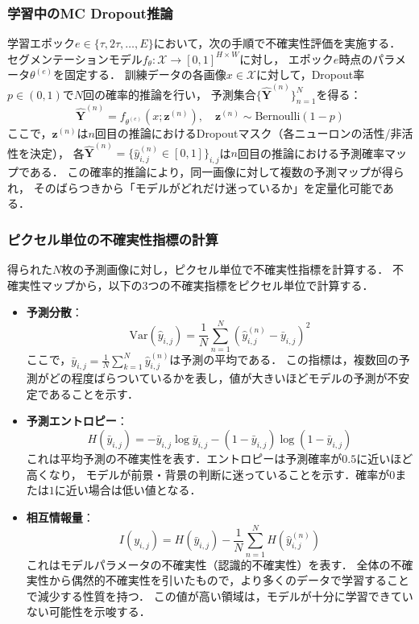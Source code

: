 \documentclass[10pt, a4paper, twocolumn]{jarticle}
\begin{document}
\subsubsection{学習中のMC Dropout推論}
学習エポック$e \in \{\tau, 2\tau, \ldots, E\}$において，次の手順で不確実性評価を実施する．
セグメンテーションモデル$f_{\theta}: \mathcal{X} \rightarrow [0,1]^{H \times W}$に対し，
エポック$e$時点のパラメータ$\theta^{(e)}$を固定する．
訓練データの各画像$x \in \mathcal{X}$に対して，Dropout率$p \in (0,1)$で$N$回の確率的推論を行い，
予測集合$\{\hat{\mathbf{Y}}^{(n)}\}_{n=1}^{N}$を得る：
%
\begin{equation}
  \hat{\mathbf{Y}}^{(n)} = f_{\theta^{(e)}}(x; \mathbf{z}^{(n)}), \quad \mathbf{z}^{(n)} \sim \text{Bernoulli}(1-p)
\end{equation}
%
ここで，$\mathbf{z}^{(n)}$は$n$回目の推論におけるDropoutマスク（各ニューロンの活性/非活性を決定），
各$\hat{\mathbf{Y}}^{(n)} = \{\hat{y}_{i,j}^{(n)} \in [0,1]\}_{i,j}$は$n$回目の推論における予測確率マップである．
この確率的推論により，同一画像に対して複数の予測マップが得られ，
そのばらつきから「モデルがどれだけ迷っているか」を定量化可能である．

\subsubsection{ピクセル単位の不確実性指標の計算}
得られた$N$枚の予測画像に対し，ピクセル単位で不確実性指標を計算する．
不確実性マップから，以下の3つの不確実指標をピクセル単位で計算する．

\begin{itemize}
  \item \textbf{予測分散}：
  \begin{equation}
    \text{Var}(\hat{y}_{i, j}) = \frac{1}{N} \sum_{n=1}^{N} (\hat{y}_{i, j}^{(n)} - \bar{y}_{i,j})^2
  \end{equation}
  ここで，$\bar{y}_{i,j} = \frac{1}{N} \sum_{k = 1}^{N} \hat{y}_{i, j} ^ {(n)}$は予測の平均である．
  この指標は，複数回の予測がどの程度ばらついているかを表し，値が大きいほどモデルの予測が不安定であることを示す．
  \item \textbf{予測エントロピー}：
  \begin{equation}
    H(\bar{y}_{i,j}) = - \bar{y}_{i,j} \log{\bar{y}_{i,j}} - (1 - \bar{y}_{i,j}) \log{(1 - \bar{y}_{i,j})}
  \end{equation}
  これは平均予測の不確実性を表す．エントロピーは予測確率が$0.5$に近いほど高くなり，
  モデルが前景・背景の判断に迷っていることを示す．確率が$0$または$1$に近い場合は低い値となる．
  \item \textbf{相互情報量}：
  \begin{equation}
    I(y_{i, j}) = H(\bar{y}_{i, j}) - \frac{1}{N}\sum_{n=1}^{N} H(\hat{y}_{i, j}^{(n)})
  \end{equation}
  これはモデルパラメータの不確実性（認識的不確実性）を表す．
  全体の不確実性から偶然的不確実性を引いたもので，より多くのデータで学習することで減少する性質を持つ．
  この値が高い領域は，モデルが十分に学習できていない可能性を示唆する．
\end{itemize}
\end{document}
